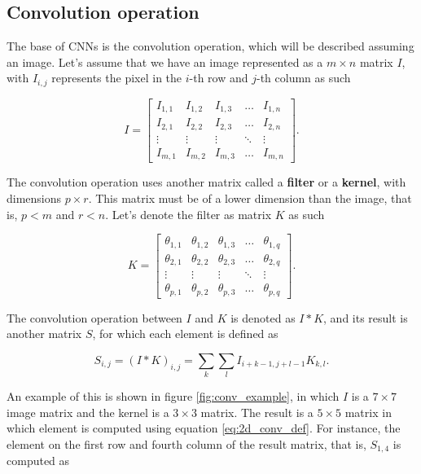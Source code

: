 \subsection{Convolution operation}

The base of CNNs is the convolution operation, which will be described assuming an image. Let's assume that we have an image represented as a $m \times n$ matrix $I$, with $I_{i,j}$ represents the pixel in the $i$-th row and $j$-th column as such

$$
  I =
    \begin{bmatrix}
      I_{1,1} & I_{1,2} & I_{1,3} & \dots  & I_{1,n} \\
      I_{2,1} & I_{2,2} & I_{2,3} & \dots  & I_{2,n} \\
      \vdots & \vdots & \vdots & \ddots & \vdots \\
      I_{m,1} & I_{m,2} & I_{m,3} & \dots  & I_{m,n}
    \end{bmatrix}.
$$

The convolution operation uses another matrix called a \textbf{filter} or a \textbf{kernel}, with dimensions $p \times r$. This matrix must be of a lower dimension than the image, that is, $p < m$ and $r < n$. Let's denote the filter as matrix $K$ as such

$$
  K =
    \begin{bmatrix}
      \theta_{1,1} & \theta_{1,2} & \theta_{1,3} & \dots  & \theta_{1,q} \\
      \theta_{2,1} & \theta_{2,2} & \theta_{2,3} & \dots  & \theta_{2,q} \\
      \vdots & \vdots & \vdots & \ddots & \vdots \\
      \theta_{p,1} & \theta_{p,2} & \theta_{p,3} & \dots  & \theta_{p,q}
    \end{bmatrix}.
$$

The convolution operation between $I$ and $K$ is denoted as $I * K$, and its result is another matrix $S$, for which each element is defined as

\begin{equation}
  \label{eq:2d_conv_def}
  S_{i,j} = (I * K)_{i,j} = \sum_{k} \sum_{l} I_{i+k-1,j+l-1} K_{k, l}.
\end{equation}

An example of this is shown in figure \ref{fig:conv_example}, in which $I$ is a $7 \times 7$ image matrix and the kernel is a $3 \times 3$ matrix. The result is a $5 \times 5$ matrix in which element is computed using equation \ref{eq:2d_conv_def}. For instance, the element on the first row and fourth column of the result matrix, that is, $S_{1,4}$ is computed as

